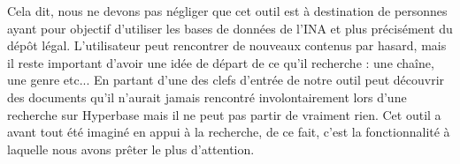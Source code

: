 
Cela dit, nous ne devons pas négliger que cet outil est à destination de personnes ayant pour objectif d'utiliser les bases de données de l'INA et plus précisément du dépôt légal. L'utilisateur peut rencontrer de nouveaux contenus par hasard, mais il reste important d'avoir une idée de départ de ce qu'il recherche : une chaîne, une genre etc... En partant d'une des clefs d'entrée de notre outil peut découvrir des documents qu'il n'aurait jamais rencontré involontairement lors d'une recherche sur Hyperbase mais il ne peut pas partir de vraiment rien. Cet outil a avant tout été imaginé en appui à la recherche, de ce fait, c'est la fonctionnalité à laquelle nous avons prêter le plus d'attention. 